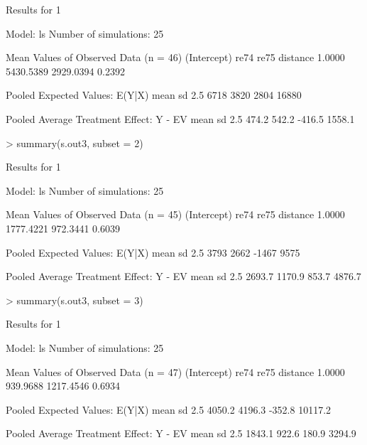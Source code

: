 \begin{enumerate}
\begin{Schunk}
\begin{Soutput}
Results for 1 

  Model: ls 
  Number of simulations: 25 

Mean Values of Observed Data (n = 46) 
(Intercept)        re74        re75    distance 
     1.0000   5430.5389   2929.0394      0.2392 

Pooled Expected Values: E(Y|X)
 mean    sd  2.5% 97.5% 
 6718  3820  2804 16880 

Pooled Average Treatment Effect: Y - EV
  mean     sd   2.5%  97.5% 
 474.2  542.2 -416.5 1558.1 


\end{Soutput}
\begin{Sinput}
> summary(s.out3, subset = 2)
\end{Sinput}
\begin{Soutput}

Results for 1 

  Model: ls 
  Number of simulations: 25 

Mean Values of Observed Data (n = 45) 
(Intercept)        re74        re75    distance 
     1.0000   1777.4221    972.3441      0.6039 

Pooled Expected Values: E(Y|X)
 mean    sd  2.5% 97.5% 
 3793  2662 -1467  9575 

Pooled Average Treatment Effect: Y - EV
  mean     sd   2.5%  97.5% 
2693.7 1170.9  853.7 4876.7 


\end{Soutput}
\begin{Sinput}
> summary(s.out3, subset = 3)
\end{Sinput}
\begin{Soutput}

Results for 1 

  Model: ls 
  Number of simulations: 25 

Mean Values of Observed Data (n = 47) 
(Intercept)        re74        re75    distance 
     1.0000    939.9688   1217.4546      0.6934 

Pooled Expected Values: E(Y|X)
   mean      sd    2.5%   97.5% 
 4050.2  4196.3  -352.8 10117.2 

Pooled Average Treatment Effect: Y - EV
  mean     sd   2.5%  97.5% 
1843.1  922.6  180.9 3294.9 


\end{Soutput}
\end{Schunk}
  

\end{enumerate}
